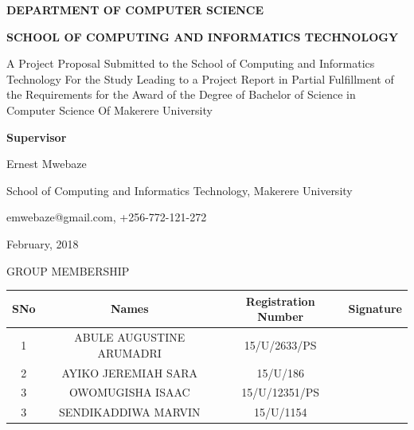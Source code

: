 \documentclass[12pt]{article}
\begin{document}
	\begin{center} \begin{Large} \textbf {DEPARTMENT OF COMPUTER SCIENCE} \end{Large}  \end{center}
	\begin{center} \begin{Large} \textbf {SCHOOL OF COMPUTING AND INFORMATICS TECHNOLOGY\\[1in]} \end{Large}  \end{center}
	\begin{center}A Project Proposal Submitted to the School of Computing and Informatics Technology
For the Study Leading to a Project Report in Partial Fulfillment of the
Requirements for the Award of the Degree of Bachelor of Science in Computer Science
Of Makerere University  \end{center}
\begin{center} \begin{large} \textbf { Supervisor} \end{large}  \end{center}
\begin{center} \begin{large} Ernest Mwebaze \end{large}  \end{center}	
\begin{center} \begin{large} School of Computing and Informatics Technology, Makerere University \end{large}  \end{center}
\begin{center} \begin{large} emwebaze@gmail.com, +256-772-121-272 \end{large}  \end{center}
\begin{center} \begin{large}February, 2018 \end{large}  \end{center}
\newpage
\begin{center}\begin{Large}GROUP MEMBERSHIP \end{Large} \end{center}

\begin{tabular} {|c|c|c|c|}
\hline
SNo & Names & Registration  Number & Signature \\ \hline
1 & ABULE AUGUSTINE ARUMADRI &  15/U/2633/PS &  \\ \hline
2 & AYIKO JEREMIAH SARA &  15/U/186 & \\ \hline
3 & OWOMUGISHA ISAAC &  15/U/12351/PS & \\ \hline
3 & SENDIKADDIWA MARVIN &  15/U/1154 & \\ \hline
\end{tabular}
\newpage
\tableofcontents
\newpage
\end{document}
